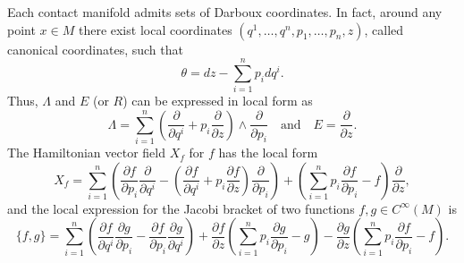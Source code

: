 \documentclass[10pt]{amsart}
\numberwithin{equation}{section}
\theoremstyle{definition}
\begin{document}
Each contact manifold admits sets of Darboux coordinates. In fact, around any point $x\in M$ there exist local coordinates $(q^{1},\ldots,q^{n},p_{1},\ldots,p_{n},z)$, called canonical coordinates, such that
\begin{equation}
\theta=dz-\sum_{i=1}^{n}p_{i}dq^{i}.
\end{equation}
Thus, $\Lambda$ and $E$ (or $R$) can be expressed in local form as
\begin{equation}
\Lambda=\sum_{i=1}^{n}\left(\frac{\partial}{\partial q^{i}}+p_{i}\frac{\partial}{\partial z}\right)\wedge \frac{\partial}{\partial p_{i}}\quad\text{and}\quad E=\frac{\partial}{\partial z}.
\end{equation}
The Hamiltonian vector field $X_{f}$ for $f$ has the local form
\begin{equation}
X_{f}=\sum_{i=1}^{n}\left(\frac{\partial f}{\partial p_{i}}\frac{\partial}{\partial q^{i}}-\left( \frac{\partial f}{\partial q^{i}}+p_{i}\frac{\partial f}{\partial z}\right) \frac{\partial}{\partial p_{i}}\right)+\left(\sum_{i=1}^{n}p_{i}\frac{\partial f}{\partial p_{i}}-f\right)\frac{\partial}{\partial z},
\end{equation}
and the local expression for the Jacobi bracket of two functions $f,g\in C^{\infty}(M)$ is
\begin{equation}
\lbrace f,g\rbrace=\sum_{i=1}^{n}\left(\frac{\partial f}{\partial q^{i}}\frac{\partial g}{\partial p_{i}}-\frac{\partial f}{\partial p_{i}}\frac{\partial g}{\partial q^{i}}\right)+\frac{\partial f}{\partial z}\left(\sum_{i=1}^{n}p_{i}\frac{\partial g}{\partial p_{i}}-g\right)-\frac{\partial g}{\partial z}\left(\sum_{i=1}^{n}p_{i}\frac{\partial f}{\partial p_{i}}-f\right).
\end{equation}
\end{document}

